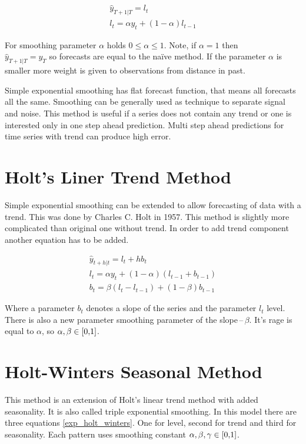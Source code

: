     \begin{gather} \label{exp_smoothing}
         \hat{y}_{T+1|T} = l_t \\ \nonumber
         l_t = \alpha y_t + (1-\alpha)l_{t-1}
    \end{gather}

    For smoothing parameter $\alpha$ holds $ 0 \leq \alpha \leq 1 $. Note, if $\alpha = 1$ then \\
    $\hat{y}_{T+1|T} = y_{T}$ so forecasts are equal to the na\"{i}ve method.
    If the parameter $\alpha $ is smaller more weight is given to observations from distance
    in past. 

    Simple exponential smoothing has flat forecast function, that means all forecasts
    all the same. Smoothing can be generally used as technique to separate signal and noise.
    This method is useful if a series does not contain any trend or one is interested only
    in one step ahead prediction. Multi step ahead predictions for time series with trend
    can produce high error.

    \section{Holt's Liner Trend Method}
    Simple exponential smoothing can be extended to allow forecasting of data with a trend. 
    This was done by Charles C. Holt in 1957. This method is slightly more complicated than 
    original one without trend. In order to add trend component another equation has to be added. 

    \begin{gather} \label{exp_holt}
        \hat{y}_{t+h|t} = l_{t} + hb_{t} \\ \nonumber
         l_t = \alpha y_t + (1 - \alpha) (l_{t-1} + b_{t-1}) \\ \nonumber
         b_t = \beta (l_t - l_{t-1}) + (1 - \beta)b_{t-1} 
    \end{gather}

    Where a parameter $b_t$ denotes a slope of the series and the parameter $l_t$ level. 
    There is also a new parameter smoothing parameter of the slope\,--\,$\beta$. 
    It's rage is equal to $\alpha$, so $\alpha,\beta \in \interval[{0,1}]$. 

    \section{Holt-Winters Seasonal Method}
    This method is an extension of Holt's linear trend method with added
    seasonality. It is also called triple exponential smoothing. In this model 
    there are three equations \ref{exp_holt_winters}. 
    One for level, second for trend and third for seasonality.
    Each pattern uses smoothing constant $ \alpha,\beta,\gamma \in \interval[{0,1}]$.

